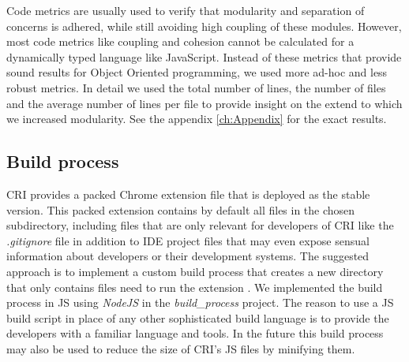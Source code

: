 Code metrics are usually used to verify that modularity and separation of concerns is adhered, while still avoiding high coupling of these modules. However, most code metrics like coupling and cohesion \cite{Coupling} cannot be calculated for a dynamically typed language like JavaScript. Instead of these metrics that provide sound results for Object Oriented programming, we used more ad-hoc and less robust metrics. In detail we used the total number of lines, the number of files and the average number of lines per file to provide insight on the extend to which we increased modularity. See the appendix \ref{ch:Appendix} for the exact results.
	
\subsection{Build process}
CRI provides a packed Chrome extension file that is deployed as the stable version. This packed extension contains by default all files in the chosen subdirectory, including files that are only relevant for developers of CRI like the \emph{.gitignore} file in addition to IDE project files that may even expose sensual information about developers or their development systems. The suggested approach is to implement a custom build process that creates a new directory that only contains files need to run the extension \cite{BuildScript}. We implemented the build process in JS using \emph{NodeJS} \cite{NodeJS} in the \emph{build\_process} project. The reason to use a JS build script in place of any other sophisticated build language is to provide the developers with a familiar language and tools. In the future this build process may also be used to reduce the size of CRI's JS files by minifying them. 